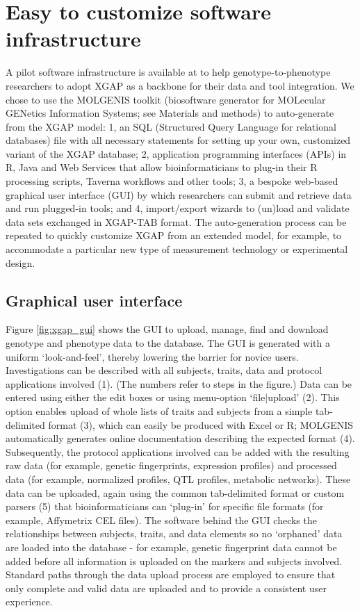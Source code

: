 \section{Easy to customize software infrastructure}
A pilot software infrastructure is available at\cite{xgap_url} to help genotype-to-phenotype researchers to adopt XGAP as a backbone for their data and tool integration.
We chose to use the MOLGENIS toolkit (biosoftware generator for MOLecular GENetics Information Systems; see Materials and methods) to auto-generate from the XGAP model: 1, an SQL (Structured Query Language for relational databases) file with all necessary statements for setting up your own, customized variant of the XGAP database; 2, application programming interfaces (APIs) in R, Java and Web Services that allow bioinformaticians to plug-in their R processing scripts, Taverna workflows\cite{Smedley_2008, xgap_taverna, Hull_2006} and other tools; 3, a bespoke web-based graphical user interface (GUI) by which researchers can submit and retrieve data and run plugged-in tools; and 4, import/export wizards to (un)load and validate data sets exchanged in XGAP-TAB format.
The auto-generation process can be repeated to quickly customize XGAP from an extended model, for example, to accommodate a particular new type of measurement technology or experimental design.

\subsection{Graphical user interface}
Figure \ref{fig:xgap_gui} shows the GUI to upload, manage, find and download genotype and phenotype data to the database.
The GUI is generated with a uniform ‘look-and-feel’, thereby lowering the barrier for novice users.
Investigations can be described with all subjects, traits, data and protocol applications involved (1).
(The numbers refer to steps in the figure.)
Data can be entered using either the edit boxes or using menu-option ‘file$|$upload’ (2).
This option enables upload of whole lists of traits and subjects from a simple tab-delimited format (3), which can easily be produced with Excel or R; MOLGENIS automatically generates online documentation describing the expected format (4).
Subsequently, the protocol applications involved can be added with the resulting raw data (for example, genetic fingerprints, expression profiles) and processed data (for example, normalized profiles, QTL profiles, metabolic networks).
These data can be uploaded, again using the common tab-delimited format or custom parsers (5) that bioinformaticians can ‘plug-in’ for specific file formats (for example, Affymetrix CEL files).
The software behind the GUI checks the relationships between subjects, traits, and data elements so no ‘orphaned’ data are loaded into the database - for example, genetic fingerprint data cannot be added before all information is uploaded on the markers and subjects involved.
Standard paths through the data upload process are employed to ensure that only complete and valid data are uploaded and to provide a consistent user experience.

